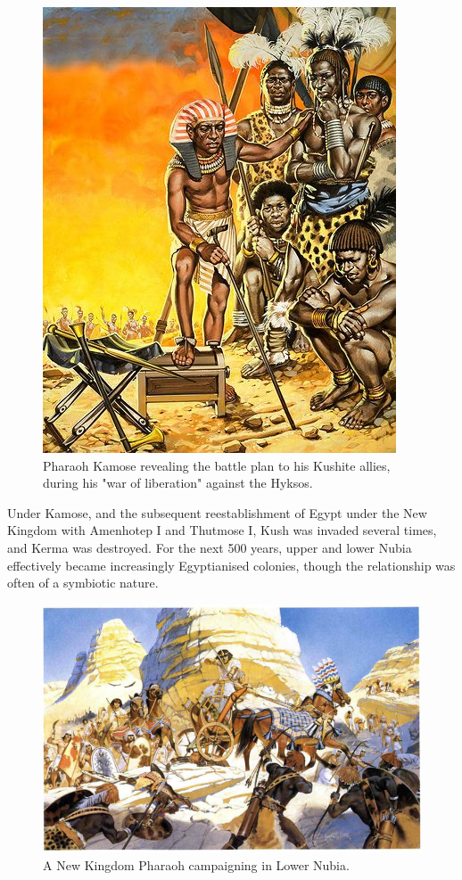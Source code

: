 \documentclass[a4paper,12pt]{scrreprt}
\begin{document}
\begin{figure}[H]
	\centering
	\includegraphics[width=\textwidth]{img/pharaoh_kamose_battle_plan}
	\caption{Pharaoh Kamose revealing the battle plan to his Kushite allies, during his "war of liberation" against the Hyksos.}
\end{figure}

Under Kamose, and the subsequent reestablishment of Egypt under the New Kingdom with Amenhotep I and Thutmose I, Kush was invaded several times, and Kerma was destroyed. For the next 500 years, upper and lower Nubia effectively became increasingly Egyptianised colonies, though the relationship was often of a symbiotic nature. 

\begin{figure}[H]
	\centering
	\includegraphics[width=\textwidth]{img/new_kingdom_battle}
	\caption{A New Kingdom Pharaoh campaigning in Lower Nubia.}
\end{figure}
\end{document}
